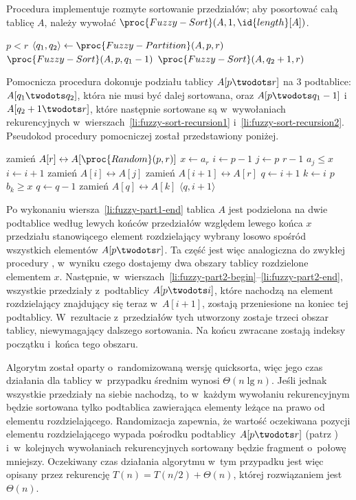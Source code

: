Procedura  implementuje rozmyte sortowanie przedziałów; aby posortować całą tablicę $A$, należy wywołać $\proc{Fuzzy-Sort}(A,1,\id{length}[A])$.
\begin{codebox}
\li	\If $p<r$
\li		\Then
			$\langle q_1,q_2\rangle\gets\proc{Fuzzy-Partition}(A,p,r)$
\li			$\proc{Fuzzy-Sort}(A,p,q_1-1)$ \label{li:fuzzy-sort-recursion1}
\li			$\proc{Fuzzy-Sort}(A,q_2+1,r)$ \label{li:fuzzy-sort-recursion2}
		\End
\end{codebox}
Pomocnicza procedura  dokonuje podziału tablicy $A[p\twodots r]$ na 3 podtablice: $A[q_1\twodots q_2]$, która nie musi być dalej sortowana, oraz $A[p\twodots q_1-1]$ i~$A[q_2+1\twodots r]$, które następnie sortowane są w~wywołaniach rekurencyjnych w~wierszach~\ref{li:fuzzy-sort-recursion1} i~\ref{li:fuzzy-sort-recursion2}. Pseudokod procedury pomocniczej został przedstawiony poniżej.
\begin{codebox}
\li	zamień $A[r]\leftrightarrow A[\proc{Random}(p,r)]$
\li	$x\gets a_r$
\li $i\gets p-1$
\li	\For $j\gets p$ \To $r-1$
\li		\Do
			\If $a_j\le x$
\li				\Then
					$i\gets i+1$
\li					zamień $A[i]\leftrightarrow A[j]$
				\End
		\End
\li	zamień $A[i+1]\leftrightarrow A[r]$ \label{li:fuzzy-part1-end}
\li	$q\gets i+1$ \label{li:fuzzy-part2-begin}
\li	\For $k\gets i$ \Downto $p$
\li		\Do
			\If $b_k\ge x$
\li				\Then
					$q\gets q-1$
\li					zamień $A[q]\leftrightarrow A[k]$
				\End
		\End \label{li:fuzzy-part2-end}
\li	\Return $\langle q,i+1\rangle$
\end{codebox}
Po wykonaniu wiersza~\ref{li:fuzzy-part1-end} tablica $A$ jest podzielona na dwie podtablice według lewych końców przedziałów względem lewego końca $x$ przedziału stanowiącego element rozdzielający wybrany losowo spośród wszystkich elementów $A[p\twodots r]$. Ta część jest więc analogiczna do zwykłej procedury , w~wyniku czego dostajemy dwa obszary tablicy rozdzielone elementem $x$. Następnie, w~wierszach~\ref{li:fuzzy-part2-begin}--\ref{li:fuzzy-part2-end}, wszystkie przedziały z~podtablicy $A[p\twodots i]$, które nachodzą na element rozdzielający znajdujący się teraz w~$A[i+1]$, zostają przeniesione na koniec tej podtablicy. W~rezultacie z~przedziałów tych utworzony zostaje trzeci obszar tablicy, niewymagający dalszego sortowania. Na końcu zwracane zostają indeksy początku i~końca tego obszaru.

\subproblem %
Algorytm został oparty o~randomizowaną wersję quicksorta, więc jego czas działania dla tablicy  w~przypadku średnim wynosi $\Theta(n\lg n)$. Jeśli jednak wszystkie przedziały na siebie nachodzą, to w~każdym wywołaniu rekurencyjnym będzie sortowana tylko podtablica zawierająca elementy leżące na prawo od elementu rozdzielającego. Randomizacja zapewnia, że wartość oczekiwana pozycji elementu rozdzielającego wypada pośrodku podtablicy $A[p\twodots r]$ (patrz ) i~w~kolejnych wywołaniach rekurencyjnych sortowany będzie fragment o~połowę mniejszy. Oczekiwany czas działania algorytmu w~tym przypadku jest więc opisany przez rekurencję $T(n)=T(n/2)+\Theta(n)$, której rozwiązaniem jest $\Theta(n)$.

\endinput
